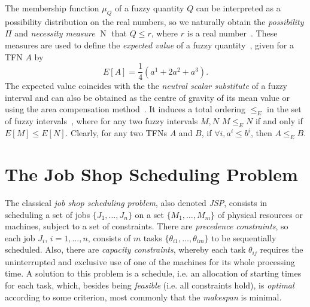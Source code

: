 \documentclass[letterpaper]{article}
\DeclareMathOperator{\N}{N}
\begin{document}
The membership function $\mu_Q$ of a fuzzy quantity $Q$ can be interpreted as a possibility distribution on the real numbers, so we naturally obtain the \emph{possibility} $\Pi$ and \emph{necessity measure} $\N$ that $Q \leq r$, where $r$ is a real number~\cite{Dubois1988}. These measures are used to define the \emph{expected value} of a fuzzy quantity~\cite{Liu2002}, given for a TFN $A$ by
\begin{equation}
E[A]=\frac{1}{4}(a^1+2a^2+a^3).
\end{equation}
The expected value coincides with the the \emph{neutral scalar substitute} of a fuzzy interval and can also be obtained as the centre of gravity of its mean value or using the area compensation method~\cite{Dubois2003}. It induces a total ordering $\leq_E$ in the set of fuzzy intervals~\cite{Fortemps1997}, where for any two fuzzy intervals $M, N$ $M \leq_E N$ if and only if $E[M] \leq E[N]$. Clearly, for any two TFNs $A$ and $B$, if $\forall i, a^i \leq b^i$, then $A \leq_E B$.

%
\section{The Job Shop Scheduling Problem}\label{secJobShop}
The classical \emph{job shop scheduling problem}, also denoted \emph{JSP}, consists in scheduling a set of jobs $\{J_1,\dots,J_n\}$ on a set $\{M_1, \dots, M_m\}$ of physical resources or machines, subject to a set of constraints. There are \emph{precedence constraints}, so each job $J_i$, $i=1,\dots,n$, consists of $m$ tasks $\{\theta_{i1},\dots,\theta_{im}\}$ to be sequentially scheduled. Also, there are \emph{capacity constraints}, whereby each task $\theta_{ij}$ requires the uninterrupted and exclusive use of one of the machines for its whole processing time. A solution to this problem is a schedule, i.e. an allocation of starting times for each task, which, besides being \emph{feasible} (i.e. all constraints hold), is \emph{optimal} according to some criterion, most commonly that the \emph{makespan} is minimal.

\end{document}
